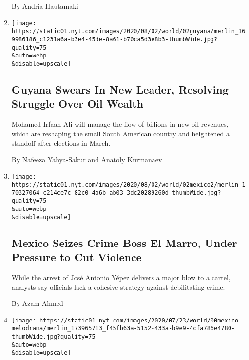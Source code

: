 \begin{enumerate}
  By Andria Hautamaki
\item
  \href{/2020/08/02/world/americas/guyana-president-ali-oil.html}{}

  \texttt{[image: https://static01.nyt.com/images/2020/08/02/world/02guyana/merlin\_169986186\_c1231a6a-b3e4-45de-8a61-b70ca5d3e8b3-thumbWide.jpg?quality=75\\\&auto=webp\\\&disable=upscale]}

  \hypertarget{guyana-swears-in-new-leader-resolving-struggle-over-oil-wealth}{%
  \subsection{Guyana Swears In New Leader, Resolving Struggle Over Oil
  Wealth}\label{guyana-swears-in-new-leader-resolving-struggle-over-oil-wealth}}

  Mohamed Irfaan Ali will manage the flow of billions in new oil
  revenues, which are reshaping the small South American country and
  heightened a standoff after elections in March.

  By Nafeeza Yahya-Sakur and Anatoly Kurmanaev
\item
  \href{/2020/08/02/world/americas/mexico-el-marro-capture.html}{}

  \texttt{[image: https://static01.nyt.com/images/2020/08/02/world/02mexico2/merlin\_170327064\_c214ce7c-82c0-4a6b-ab03-3dc20289260d-thumbWide.jpg?quality=75\\\&auto=webp\\\&disable=upscale]}

  \hypertarget{mexico-seizes-crime-boss-el-marro-under-pressure-to-cut-violence}{%
  \subsection{Mexico Seizes Crime Boss El Marro, Under Pressure to Cut
  Violence}\label{mexico-seizes-crime-boss-el-marro-under-pressure-to-cut-violence}}

  While the arrest of José Antonio Yépez delivers a major blow to a
  cartel, analysts say officials lack a cohesive strategy against
  debilitating crime.

  By Azam Ahmed
\item
  \href{/2020/08/02/world/americas/mexico-tv-virus-telenovela.html}{}

  \texttt{[image: https://static01.nyt.com/images/2020/07/23/world/00mexico-melodrama/merlin\_173965713\_f45fb63a-5152-433a-b9e9-4cfa786e4780-thumbWide.jpg?quality=75\\\&auto=webp\\\&disable=upscale]}

  \hypertarget{less-sex-more-viewers-pandemic-boosts-mexicos-flagging-telenovelas}{%
}
\end{enumerate}
